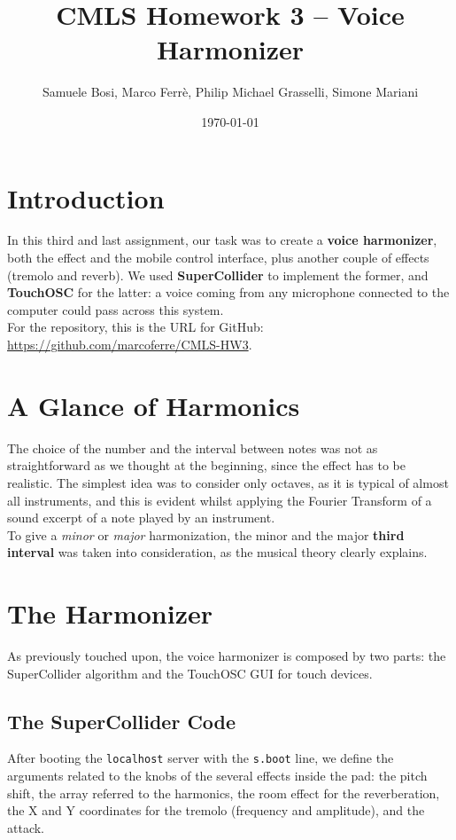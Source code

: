 \documentclass[11pt]{article}
\author{Samuele Bosi, Marco Ferrè, Philip Michael Grasselli, Simone Mariani}
\title{\textbf{CMLS Homework 3 – Voice Harmonizer}}
\date{\today}
\begin{document}
\maketitle
\tableofcontents

\section{Introduction}
In this third and last assignment, our task was to create a \textbf{voice harmonizer}, both the effect and the mobile control interface, plus another couple of effects (tremolo and reverb). We used \textbf{SuperCollider} to implement the former, and \textbf{TouchOSC} for the latter: a voice coming from any microphone connected to the computer could pass across this system.\\
For the repository, this is the URL for GitHub: \url{https://github.com/marcoferre/CMLS-HW3}.

\section{A Glance of Harmonics}

The choice of the number and the interval between notes was not as straightforward as we thought at the beginning, since the effect has to be realistic. The simplest idea was to consider only octaves, as it is typical of almost all instruments, and this is evident whilst applying the Fourier Transform of a sound excerpt of a note played by an instrument.\\
To give a \textit{minor} or \textit{major} harmonization, the minor and the major \textbf{third interval} was taken into consideration, as the musical theory clearly explains.

\section{The Harmonizer}

As previously touched upon, the voice harmonizer is composed by two parts: the SuperCollider algorithm and the TouchOSC GUI for touch devices.

\subsection{The SuperCollider Code}

After booting the \texttt{localhost} server with the \texttt{s.boot} line, we define the arguments related to the knobs of the several effects inside the pad: the pitch shift, the array referred to the harmonics, the room effect for the reverberation, the X and Y coordinates for the tremolo (frequency and amplitude), and the attack.\\
\end{document}
